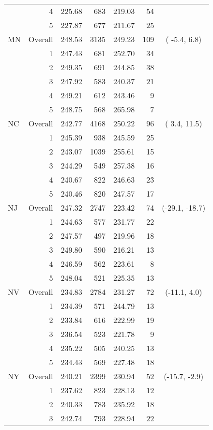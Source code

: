 \begin{longtable}{lrrr@{\extracolsep{.25cm}}rrc}
   & 4 & 225.68 & 683 & 219.03 &  54 &  \\ 
   & 5 & 227.87 & 677 & 211.67 &  25 &  \\ 
   \hline
MN & Overall & 248.53 & 3135 & 249.23 & 109 & ( -5.4,   6.8) \\ 
   & 1 & 247.43 & 681 & 252.70 &  34 &  \\ 
   & 2 & 249.35 & 691 & 244.85 &  38 &  \\ 
   & 3 & 247.92 & 583 & 240.37 &  21 &  \\ 
   & 4 & 249.21 & 612 & 243.46 &   9 &  \\ 
   & 5 & 248.75 & 568 & 265.98 &   7 &  \\ 
   \hline
NC & Overall & 242.77 & 4168 & 250.22 &  96 & (  3.4,  11.5) \\ 
   & 1 & 245.39 & 938 & 245.59 &  25 &  \\ 
   & 2 & 243.07 & 1039 & 255.61 &  15 &  \\ 
   & 3 & 244.29 & 549 & 257.38 &  16 &  \\ 
   & 4 & 240.67 & 822 & 246.63 &  23 &  \\ 
   & 5 & 240.46 & 820 & 247.57 &  17 &  \\ 
   \hline
NJ & Overall & 247.32 & 2747 & 223.42 &  74 & (-29.1, -18.7) \\ 
   & 1 & 244.63 & 577 & 231.77 &  22 &  \\ 
   & 2 & 247.57 & 497 & 219.96 &  18 &  \\ 
   & 3 & 249.80 & 590 & 216.21 &  13 &  \\ 
   & 4 & 246.59 & 562 & 223.61 &   8 &  \\ 
   & 5 & 248.04 & 521 & 225.35 &  13 &  \\ 
   \hline
NV & Overall & 234.83 & 2784 & 231.27 &  72 & (-11.1,   4.0) \\ 
   & 1 & 234.39 & 571 & 244.79 &  13 &  \\ 
   & 2 & 233.84 & 616 & 222.99 &  19 &  \\ 
   & 3 & 236.54 & 523 & 221.78 &   9 &  \\ 
   & 4 & 235.22 & 505 & 240.25 &  13 &  \\ 
   & 5 & 234.43 & 569 & 227.48 &  18 &  \\ 
   \hline
NY & Overall & 240.21 & 2399 & 230.94 &  52 & (-15.7,  -2.9) \\ 
   & 1 & 237.62 & 823 & 228.13 &  12 &  \\ 
   & 2 & 240.33 & 783 & 235.92 &  18 &  \\ 
   & 3 & 242.74 & 793 & 228.94 &  22 &  \\ 

\end{longtable}

